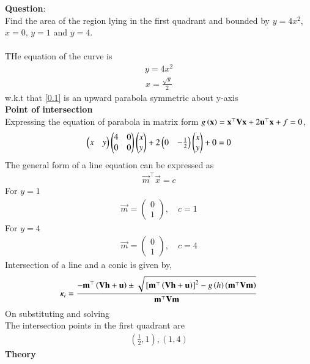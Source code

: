 \documentclass[journal]{IEEEtran}
\begin{document}
\textbf{Question}:\\
Find the area of the region lying in the first quadrant and bounded by $y=4x^2$, $x=0$, $y=1$ and $y=4$. \\ 
\solution \\
THe equation of the curve is 
\begin{align}
     y = 4x^2
     \label{0.1}
\end{align}
\begin{align}
    x = \frac{\sqrt{y}}{2}
\end{align}
w.k.t that \ref{0.1} is an upward parabola symmetric about y-axis\\
\textbf{Point of intersection}\\
Expressing the equation of parabola in matrix form $g\left(\mathbf{x}\right)= \mathbf{x}^{\top}\mathbf{V}\mathbf{x}+2\mathbf{u}^{\top}\mathbf{x}+f=0$,
\begin{align}
  \begin{pmatrix}x&y\end{pmatrix}\begin{pmatrix}4&0\\0&0\end{pmatrix}\begin{pmatrix}x\\y\end{pmatrix}+2\begin{pmatrix}0 & -\frac{1}{2}\end{pmatrix}\begin{pmatrix}x\\y\end{pmatrix}+0=0
\end{align}
The general form of a line equation can be expressed as
\begin{align}
    \vec{m}^\top \vec{x} = c
\end{align}
For $y=1$
\begin{align}
    \vec{m} = \begin{pmatrix} 0 \\ 1 \end{pmatrix}, \quad c = 1
\end{align}
For $y=4$
\begin{align}
    \vec{m} = \begin{pmatrix} 0 \\ 1 \end{pmatrix}, \quad c = 4
\end{align}
Intersection of a line and a conic is given by,
\begin{align}
  \kappa_i=\frac{-\mathbf{m}^{\top}\left(\mathbf{Vh}+\mathbf{u}\right)\pm\sqrt{{}\left[\mathbf{m}^{\top}\left(\mathbf{Vh}+\mathbf{u}\right)\right]^2-g\left(h\right)\left(\mathbf{m}^{\top}\mathbf{Vm}\right)}}{\mathbf{m}^{\top}\mathbf{Vm}}
\end{align}
On substituting and solving \\
The intersection points in the first quadrant are 
\begin{align}
    \left( \frac{1}{2}, 1 \right),  (1, 4)
\end{align}
\textbf{Theory} \\ 
\end{document}
